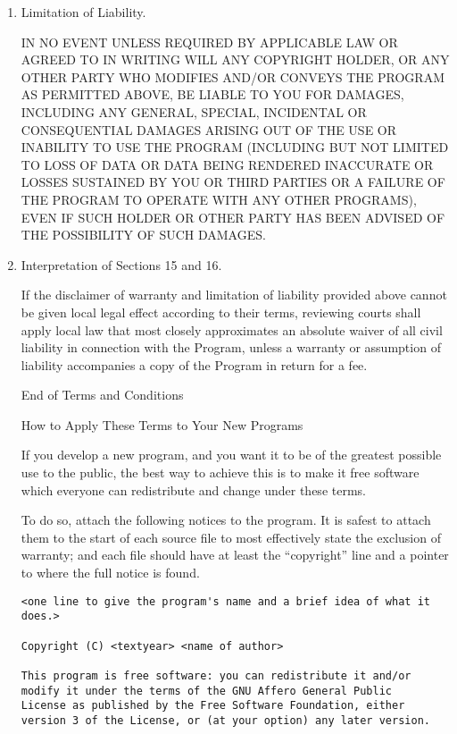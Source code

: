 \documentclass{article}%
\begin{document}
\begin{flushleft}
\begin{enumerate}
\item Limitation of Liability.

 IN NO EVENT UNLESS REQUIRED BY APPLICABLE LAW OR AGREED TO IN
 WRITING WILL ANY COPYRIGHT HOLDER, OR ANY OTHER PARTY WHO MODIFIES
 AND/OR CONVEYS THE PROGRAM AS PERMITTED ABOVE, BE LIABLE TO YOU FOR
 DAMAGES, INCLUDING ANY GENERAL, SPECIAL, INCIDENTAL OR CONSEQUENTIAL
 DAMAGES ARISING OUT OF THE USE OR INABILITY TO USE THE PROGRAM
 (INCLUDING BUT NOT LIMITED TO LOSS OF DATA OR DATA BEING RENDERED
 INACCURATE OR LOSSES SUSTAINED BY YOU OR THIRD PARTIES OR A FAILURE
 OF THE PROGRAM TO OPERATE WITH ANY OTHER PROGRAMS), EVEN IF SUCH
 HOLDER OR OTHER PARTY HAS BEEN ADVISED OF THE POSSIBILITY OF SUCH
 DAMAGES.

\item Interpretation of Sections 15 and 16.

If the disclaimer of warranty and limitation of liability provided
above cannot be given local legal effect according to their terms,
reviewing courts shall apply local law that most closely approximates
an absolute waiver of all civil liability in connection with the
Program, unless a warranty or assumption of liability accompanies a
copy of the Program in return for a fee.

\begin{center}
{\Large End of Terms and Conditions}

\bigskip
How to Apply These Terms to Your New Programs
\end{center}

If you develop a new program, and you want it to be of the greatest
possible use to the public, the best way to achieve this is to make it
free software which everyone can redistribute and change under these terms.

To do so, attach the following notices to the program. It is safest
to attach them to the start of each source file to most effectively
state the exclusion of warranty; and each file should have at least
the ``copyright'' line and a pointer to where the full notice is found.

{\footnotesize
\begin{verbatim}
<one line to give the program's name and a brief idea of what it does.>

Copyright (C) <textyear> <name of author>

This program is free software: you can redistribute it and/or 
modify it under the terms of the GNU Affero General Public 
License as published by the Free Software Foundation, either 
version 3 of the License, or (at your option) any later version. 


\end{verbatim}}
\end{enumerate}
\end{flushleft}
\end{document}
